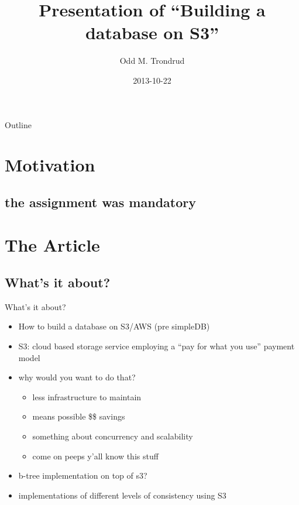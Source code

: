 \documentclass{beamer}
\title[Building a database on S3] %
{Presentation of ``Building a database on S3''}
\author[Odd M. Trondrud]{Odd M. Trondrud}
\institute[Norwegian University of Technology and Science] 
{
  Presentation of seminar article\\
  TDT4150 ``Avanserte Databasesystemer''\\
  autumn semester of 2013\\
  NTNU
}
\date[]
{2013-10-22}
\begin{document}
\begin{frame}
  \titlepage
\end{frame}

\begin{frame}{Outline}
  \tableofcontents
\end{frame}



\section{Motivation}

\subsection{the assignment was mandatory}

\section{The Article}
  \subsection{What's it about?}

    \begin{frame}{What's it about?}
      \begin{itemize}
      \item
        How to build a database on S3/AWS (pre simpleDB)
      \item
        S3: cloud based storage service employing a 
        ``pay for what you use'' payment model
      \item
        why would you want to do that?
        \begin{itemize}
        \item
          less infrastructure to maintain
        \item
          means possible \$\$ savings
        \item
          something about concurrency and scalability
        \item
          come on peeps y'all know this stuff
        \end{itemize}
      \item
        b-tree implementation on top of s3?
      \item
        implementations of different levels of consistency using S3
      \end{itemize}
    \end{frame}
\end{document}
